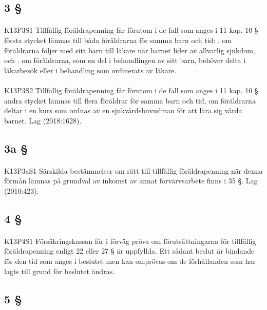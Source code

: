 \documentclass[a4paper,notitlepage,openany,10pt]{book}
\begin{document}
\subsection*{3 §}
\paragraph*{}
{\tiny K13P3S1}
Tillfällig föräldrapenning får förutom i de fall som anges i 11 kap. 10 § första stycket lämnas till båda föräldrarna för samma barn och tid:
. om föräldrarna följer med sitt barn till läkare när barnet lider av allvarlig sjukdom, och
. om föräldrarna, som en del i behandlingen av sitt barn, behöver delta i läkarbesök eller i behandling som ordinerats av läkare.
\paragraph*{}
{\tiny K13P3S2}
Tillfällig föräldrapenning får förutom i de fall som anges i 11 kap. 10 § andra stycket lämnas till flera föräldrar för samma barn och tid, om föräldrarna deltar i en kurs som ordnas av en sjukvårdshuvudman för att lära sig vårda barnet.
Lag (2018:1628).
\subsection*{3a §}
\paragraph*{}
{\tiny K13P3aS1}
Särskilda bestämmelser om rätt till tillfällig föräldrapenning när denna förmån lämnas på grundval av inkomst av annat förvärvsarbete finns i 35 §.
Lag (2010:423).
\subsection*{4 §}
\paragraph*{}
{\tiny K13P4S1}
Försäkringskassan får i förväg pröva om förutsättningarna för tillfällig föräldrapenning enligt 22 eller 27 § är uppfyllda. Ett sådant beslut är bindande för den tid som anges i beslutet men kan omprövas om de förhållanden som har lagts till grund för beslutet ändras.
\subsection*{5 §}
\end{document}
